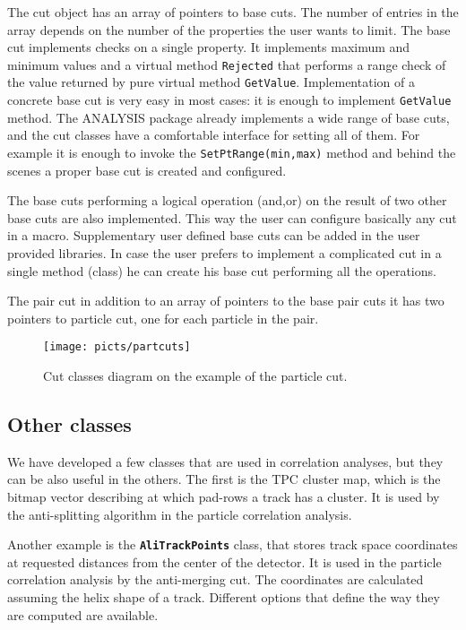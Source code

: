 \documentclass[12pt,a4paper,twoside]{article}
\newcommand{\class}[1]{\texttt{\textbf{#1}}\xspace}
\begin{document}
{The cut object has an array of pointers to
base cuts. The number of entries in the array depends 
on the number of the properties the user wants to limit. 
The base cut implements checks on a single property. 
It implements maximum and minimum values and a virtual method \texttt{Rejected} 
that performs a range check of the value returned by pure
virtual method \texttt{GetValue}. Implementation of a concrete
base cut is very easy in most cases: it is enough to
implement \texttt{GetValue} method. The ANALYSIS package
already implements a wide range of base cuts,
and the cut classes have a comfortable interface for
setting all of them. For example it is enough to invoke
the \texttt{SetPtRange(min,max)} method and behind the scenes
a proper base cut is created and configured.

The base cuts performing a logical operation (and,or) on the result of two
other base cuts are also implemented. This way the user can configure basically any
cut in a macro. Supplementary user defined base cuts can be added in the user 
provided libraries.
In case the user prefers to implement a complicated cut in a single method (class) 
he can create his base cut performing all the operations.

The pair cut in addition to an array of pointers to the base pair 
cuts it has two pointers to particle cut, one for each particle in
the pair. 

\begin{figure}
  \begin{center}
    \texttt{[image: picts/partcuts]}
  \end{center}
  \caption
  {Cut classes diagram on the example of the particle cut.
    \label{cap:soft:partcut}}
\end{figure}


\subsection{Other classes}

We have developed a few classes that are used in correlation analyses,
but they can be also useful in the others. The first is the TPC cluster map,
which is the bitmap vector describing at which pad-rows a track has a cluster.
It is used by the anti-splitting algorithm in the particle correlation
analysis.

Another example is the \class{AliTrackPoints} class, that stores 
track space coordinates at requested distances from the center of 
the detector. It is used in the particle correlation analysis
by the anti-merging cut.
The coordinates are calculated assuming the helix shape
of a track. Different options that define the way they are computed
are available. 



}
\end{document}
